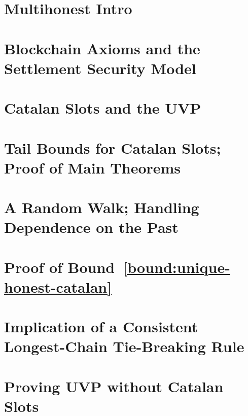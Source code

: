 \chapter{Multihonest Intro}\label{ch:intro-multihonest}


\chapter{Blockchain Axioms and the Settlement Security Model}\label{sec:model-multihonest}


\chapter{Catalan Slots and the UVP}\label{sec:catalan}\label{sec:definitions-multihonest}




\chapter{Tail Bounds for Catalan Slots; Proof of Main Theorems}\label{sec:bounds-main-proofs-multihonest}


\chapter{A Random Walk; Handling Dependence on the Past}\label{sec:rand-walk}
 


\chapter{Proof of \texorpdfstring{Bound~\ref{bound:unique-honest-catalan}}{the First Tail Bound} }\label{sec:estimates-multihonest}


\chapter{Implication of a Consistent Longest-Chain Tie-Breaking Rule}\label{sec:lcr-tie-multihonest}


\chapter{Proving UVP without Catalan Slots}\label{sec:fork-framework}




